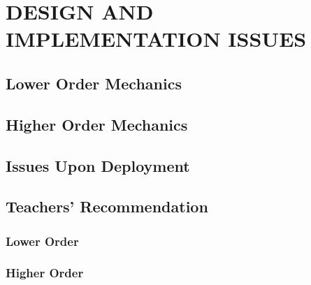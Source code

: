 \chapter{DESIGN AND IMPLEMENTATION ISSUES}

\section{Lower Order Mechanics}



\section{Higher Order Mechanics}



\section{Issues Upon Deployment}



\section{Teachers' Recommendation}

\subsection{Lower Order}


\subsection{Higher Order}

